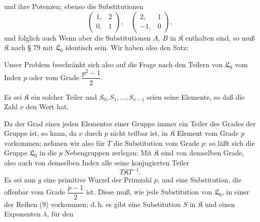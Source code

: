 und ihre Potenzen; ebenso die Substitutionen
\[
\begin{pmatrix} 1, & 2 \\ 0, & 1 \end{pmatrix},\quad \begin{pmatrix} 2, & 1 \\ -1, & 0 \end{pmatrix},
\]
und folglich auch
Wenn aber die Substitutionen $A$, $B$ in $\mathfrak{K}$ enthalten sind, so muß $\mathfrak{K}$ nach § 79 mit $\mathfrak{L}_0$ identisch sein. Wir haben also den Satz:


Unser Problem beschränkt sich also auf die Frage nach den Teilern von $\mathfrak{L}_0$ vom Index $p$ oder vom Grade $\dfrac{p^2-1}{2}$.

Es sei $\mathfrak{K}$ ein solcher Teiler und $S_0, S_1, \ldots, S_{\nu-1}$ seien seine Elemente, so daß die Zahl $\nu$ den Wert
hat.

Da der Grad eines jeden Elementes einer Gruppe immer ein Teiler des Grades der Gruppe ist, so kann, da $\nu$ durch $p$ nicht teilbar ist, in $\mathfrak{K}$  Element vom Grade $p$ vorkommen; nehmen wir also für $T$ die Substitution vom Grade $p$:
so läßt sich die Gruppe $\mathfrak{L}_0$ in die $p$ Nebengruppen zerlegen:
Mit $\mathfrak{K}$ sind von demselben Grade, also auch von demselben Index alle seine konjugierten Teiler
\[
T\mathfrak{K}T^{-1}.
\]
Es sei nun $g$ eine primitive Wurzel der Primzahl $p$, und
eine Substitution, die offenbar vom Grade $\dfrac{p-1}{2}$ ist. Diese muß, wie jede Substitution von $\mathfrak{L}_0$, in einer der Reihen (9) vorkommen; d.\,h. es gibt eine Substitution $S$ in $\mathfrak{K}$ und einen Exponenten $\lambda$, für den
